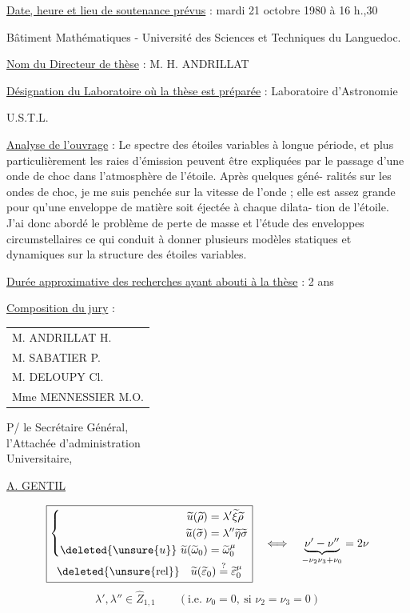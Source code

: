 \uline{Date, heure et lieu de soutenance prévus} : mardi 21 octobre 1980 à 16 h.,30

Bâtiment Mathématiques - Université des Sciences et Techniques du Languedoc.

\uline{Nom du Directeur de thèse} : M. H. ANDRILLAT

\uline{Désignation du Laboratoire où la thèse est préparée} : Laboratoire d'Astronomie

\hfill U.S.T.L.

\uline{Analyse de l'ouvrage} : Le spectre des étoiles variables à longue période, et plus particulièrement les raies d'émission peuvent être expliquées par le passage d'une onde de choc dans l'atmosphère de l'étoile. Après quelques géné-\newline
ralités sur les ondes de choc, je me suis penchée sur la vitesse de l'onde ; elle est assez grande pour qu'une enveloppe de matière soit éjectée à chaque dilata-\newline
tion de l'étoile. J'ai donc abordé le problème de perte de masse et l'étude des enveloppes circumstellaires ce qui conduit à donner plusieurs modèles statiques et dynamiques sur la structure des étoiles variables.

\uline{Durée approximative des recherches ayant abouti à la thèse} : 2 ans

\uline{Composition du jury} :
\begin{tabular}{l}
M. ANDRILLAT H.\\
M. SABATIER P.\\
M. DELOUPY Cl.\\
Mme MENNESSIER M.O.
\end{tabular}

\begin{flushright}
P/ le Secrétaire Général,\\
l'Attachée d'administration\\
Universitaire,


\uline{A. GENTIL}
\end{flushright}

\[
\boxed{\begin{gathered}
\left\{\begin{aligned}
\widetilde u(\widetilde\rho)&=\lambda'\widetilde\xi\widetilde\rho\\
\widetilde u(\widetilde\sigma)&=\lambda''\widetilde\eta\widetilde\sigma\\
\deleted{\unsure{u}}\ \widetilde u(\widetilde\omega_0)&=\widetilde\omega_0^\mu
\end{aligned}\right.\\
\deleted{\unsure{\mathrm{rel}}}\quad
\widetilde u(\widetilde\varepsilon_0)\overset?=\widetilde\varepsilon_0^\mu
\end{gathered}}
\quad\Longleftrightarrow\quad
\underbrace{\nu'-\nu''}_{-\nu_2\nu_3+\nu_0}=2\nu
\]
\[
\lambda',\lambda''\in\widehat Z_{1,1}
\qquad(\text{i.e. }\nu_0=0,\ \text{si }\nu_2=\nu_3=0)
\]

